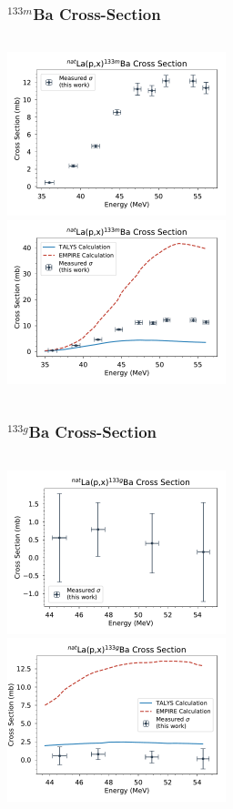 \documentclass[12pt,xcolor=dvipsnames]{beamer}
\begin{document}
\begin{frame}
\frametitle{$^{133m}$Ba Cross-Section}
\begin{columns}[c]
\column{2.5in}
\includegraphics[width=2.5in]{cross_sections/133BAm_only}
\\
\column{2.5in}
\includegraphics[width=2.5in]{cross_sections/133BAm}
\\
\end{columns}
\end{frame}

\begin{frame}
\frametitle{$^{133g}$Ba Cross-Section}
\begin{columns}[c]
\column{2.5in}
\includegraphics[width=2.5in]{cross_sections/133BAg_only}
\\
\column{2.5in}
\includegraphics[width=2.5in]{cross_sections/133BAg}
\\
\end{columns}
\end{frame}
\end{document}
